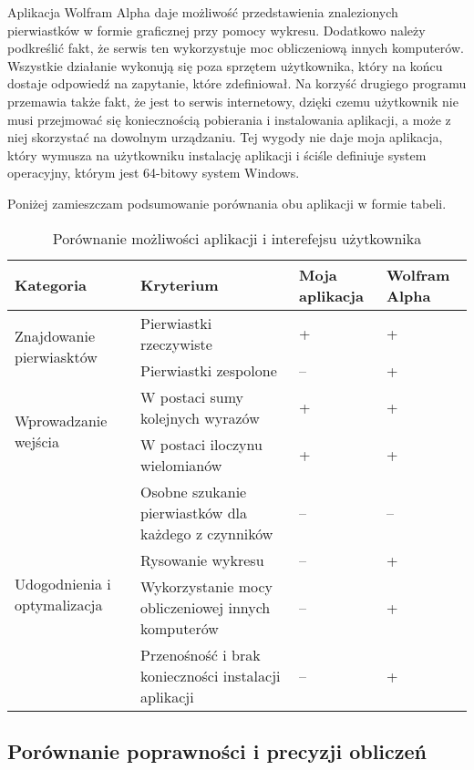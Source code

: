 Aplikacja Wolfram Alpha daje możliwość przedstawienia znalezionych pierwiastków w formie graficznej przy pomocy wykresu. Dodatkowo należy podkreślić fakt, że serwis ten wykorzystuje moc obliczeniową innych komputerów. Wszystkie działanie wykonują się poza sprzętem użytkownika, który na końcu dostaje odpowiedź na zapytanie, które zdefiniował. Na korzyść drugiego programu przemawia także fakt, że jest to serwis internetowy, dzięki czemu użytkownik nie musi przejmować się koniecznością pobierania i instalowania aplikacji, a może z niej skorzystać na dowolnym urządzaniu. Tej wygody nie daje moja aplikacja, który wymusza na użytkowniku instalację aplikacji i ściśle definiuje system operacyjny, którym jest 64-bitowy system Windows.

Poniżej zamieszczam podsumowanie porównania obu aplikacji w formie tabeli.

\begin{table}
\caption{Porównanie możliwości aplikacji i interefejsu użytkownika}
	\begin{tabular}{ |p{4.7cm}|p{5.5cm}|p{1.5cm}|p{1.5cm}| } 
		\hline
		Kategoria & Kryterium & Moja aplikacja & Wolfram Alpha \\
		\hline
		\multirow{2}{*}{Znajdowanie pierwiasktów}
		& Pierwiastki rzeczywiste & + & + \\
		& Pierwiastki zespolone & -- & + \\
		\hline
		\multirow{2}{*}{Wprowadzanie wejścia}
		&W postaci sumy kolejnych wyrazów & + & + \\
		&W postaci iloczynu wielomianów & + & + \\
		\hline
		\multirow{4}{*}{Udogodnienia i optymalizacja}
		&Osobne szukanie pierwiastków dla każdego z czynników & -- & -- \\
		&Rysowanie wykresu & -- & + \\
		&Wykorzystanie mocy obliczeniowej innych komputerów & -- & + \\
		&Przenośność i brak konieczności instalacji aplikacji & -- & + \\
		\hline
	\end{tabular}
\end{table}

\subsection {Porównanie poprawności i precyzji obliczeń}

